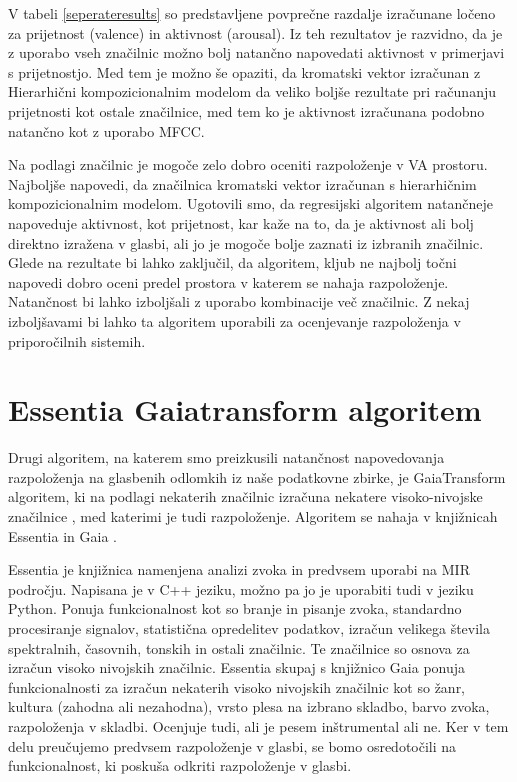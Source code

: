 \documentclass[a4paper, 12pt]{book}
\begin{document}
{V tabeli \ref{seperateresults} so predstavljene povprečne razdalje  izračunane ločeno za prijetnost (valence) in aktivnost (arousal). Iz teh rezultatov je razvidno, da je z uporabo vseh značilnic možno bolj natančno  napovedati aktivnost v primerjavi s prijetnostjo. Med tem je možno še opaziti, da kromatski vektor izračunan z Hierarhični kompozicionalnim modelom da veliko boljše rezultate pri računanju prijetnosti kot ostale značilnice, med tem ko je aktivnost izračunana podobno natančno kot z uporabo MFCC. 

Na podlagi značilnic je mogoče zelo dobro oceniti razpoloženje v VA prostoru. Najboljše napovedi, da značilnica kromatski vektor izračunan s hierarhičnim kompozicionalnim modelom. Ugotovili smo, da regresijski algoritem natančneje napoveduje aktivnost, kot prijetnost, kar kaže na to, da je aktivnost ali bolj direktno izražena v glasbi, ali jo je mogoče bolje zaznati iz izbranih značilnic. Glede na rezultate bi lahko zaključil, da algoritem, kljub ne najbolj točni napovedi dobro oceni predel prostora v katerem se nahaja razpoloženje. Natančnost bi lahko izboljšali z uporabo kombinacije več značilnic. Z nekaj izboljšavami bi lahko ta algoritem uporabili za ocenjevanje razpoloženja v priporočilnih sistemih.

\section{Essentia Gaiatransform algoritem}

Drugi algoritem, na katerem smo preizkusili natančnost napovedovanja razpoloženja na glasbenih odlomkih iz naše podatkovne zbirke, je GaiaTransform algoritem, ki na podlagi nekaterih značilnic izračuna nekatere visoko-nivojske značilnice \cite{bogdanov2013form}, med katerimi je tudi razpoloženje. Algoritem se nahaja v knjižnicah Essentia in Gaia \cite{bogdanov2013essentia}.

Essentia je knjižnica namenjena analizi zvoka in predvsem uporabi na MIR področju. Napisana je v C++ jeziku, možno pa jo je uporabiti tudi v jeziku Python. Ponuja funkcionalnost kot so branje in pisanje zvoka, standardno procesiranje signalov, statistična opredelitev podatkov, izračun velikega števila spektralnih, časovnih, tonskih in ostali značilnic. Te značilnice so osnova za izračun visoko nivojskih značilnic. Essentia skupaj s knjižnico Gaia ponuja funkcionalnosti za izračun nekaterih visoko nivojskih značilnic kot so žanr, kultura (zahodna ali nezahodna), vrsto plesa na izbrano skladbo, barvo zvoka, razpoloženja v skladbi. Ocenjuje tudi, ali je pesem inštrumental ali ne. Ker v tem delu preučujemo predvsem razpoloženje v glasbi, se bomo osredotočili na funkcionalnost, ki poskuša odkriti razpoloženje v glasbi.

}
\end{document}
